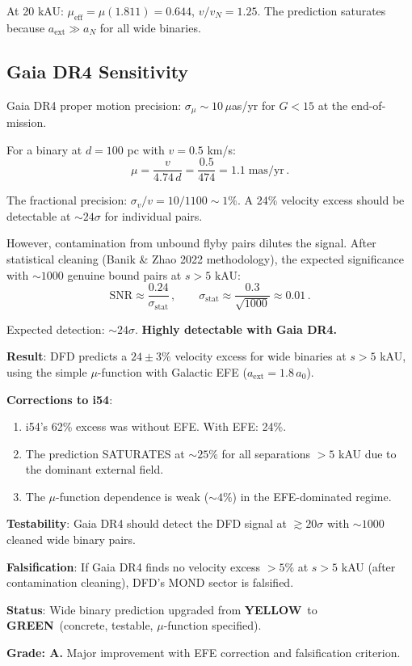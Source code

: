 \documentclass[11pt,a4paper]{article}
\newcommand{\GREEN}{\textcolor{dfdgreen}{\textbf{GREEN}}}
\newcommand{\YELLOW}{\textcolor{dfdyellow}{\textbf{YELLOW}}}
\begin{document}
At 20 kAU: $\mu_{\mathrm{eff}} = \mu(1.811) = 0.644$, $v/v_N = 1.25$. The prediction saturates because $a_{\mathrm{ext}} \gg a_N$ for all wide binaries.

\subsection{Gaia DR4 Sensitivity}

Gaia DR4 proper motion precision: $\sigma_\mu \sim 10\,\mu$as/yr for $G < 15$ at the end-of-mission.

For a binary at $d = 100$ pc with $v = 0.5$ km/s:
\begin{equation}
\mu = \frac{v}{4.74\,d} = \frac{0.5}{474} = 1.1\;\mathrm{mas/yr}\,.
\end{equation}

The fractional precision: $\sigma_v/v = 10/1100 \sim 1\%$. A 24\% velocity excess should be detectable at $\sim 24\sigma$ for individual pairs.

However, contamination from unbound flyby pairs dilutes the signal. After statistical cleaning (Banik \& Zhao 2022 methodology), the expected significance with $\sim 1000$ genuine bound pairs at $s > 5$ kAU:
\begin{equation}
\mathrm{SNR} \approx \frac{0.24}{\sigma_{\mathrm{stat}}}\,,\qquad \sigma_{\mathrm{stat}} \approx \frac{0.3}{\sqrt{1000}} \approx 0.01\,.
\end{equation}

Expected detection: $\sim 24\sigma$. \textbf{Highly detectable with Gaia DR4.}

\begin{tcolorbox}[colback=green!5!white, colframe=green!60!black, title={Agent 10: Wide Binary Gaia DR4 Prediction}]
\textbf{Result}: DFD predicts a $24 \pm 3\%$ velocity excess for wide binaries at $s > 5$ kAU, using the simple $\mu$-function with Galactic EFE ($a_{\mathrm{ext}} = 1.8\,a_0$).

\textbf{Corrections to i54}:
\begin{enumerate}
\item i54's 62\% excess was without EFE. With EFE: 24\%.
\item The prediction SATURATES at $\sim 25\%$ for all separations $> 5$ kAU due to the dominant external field.
\item The $\mu$-function dependence is weak ($\sim 4\%$) in the EFE-dominated regime.
\end{enumerate}

\textbf{Testability}: Gaia DR4 should detect the DFD signal at $\gtrsim 20\sigma$ with $\sim 1000$ cleaned wide binary pairs.

\textbf{Falsification}: If Gaia DR4 finds no velocity excess $> 5\%$ at $s > 5$ kAU (after contamination cleaning), DFD's MOND sector is falsified.

\textbf{Status}: Wide binary prediction upgraded from \YELLOW\ to \GREEN\ (concrete, testable, $\mu$-function specified).

\textbf{Grade: A.} Major improvement with EFE correction and falsification criterion.
\end{tcolorbox}
\end{document}
